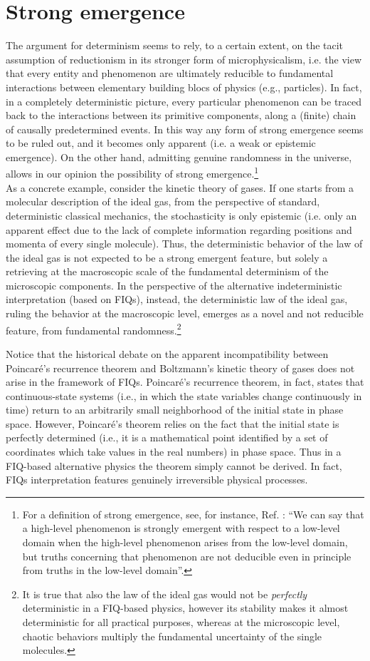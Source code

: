 \documentclass[aps,prl,twocolumn,showpacs,superscriptaddress,groupedaddress, nofootinbib]{revtex4-1}
\begin{document}
\section{Strong emergence}
The argument for determinism seems to rely, to a certain extent, on the tacit assumption of reductionism in its stronger form of microphysicalism, i.e. the view that every entity and phenomenon are ultimately reducible to fundamental interactions between elementary building blocs of physics (e.g., particles). In fact, in a completely deterministic picture, every particular phenomenon can be traced back to the interactions between its primitive components, along a (finite) chain of causally predetermined events. In this way any form of strong emergence seems to be ruled out, and it becomes only apparent (i.e. a weak or epistemic emergence). On the other hand, admitting genuine randomness in the universe, allows in our opinion the possibility of strong emergence.\footnote{For a definition of strong emergence, see, for instance, Ref. \cite{chalmers}: ``We can say that a high-level phenomenon is strongly emergent with respect to a
low-level domain when the high-level phenomenon arises from the low-level domain, but truths concerning that phenomenon are not deducible even in principle from truths in the low-level domain''.}\\
As a concrete example, consider the kinetic theory of gases. If one starts from a molecular description of the ideal gas, from the perspective of standard, deterministic classical mechanics, the stochasticity is only epistemic (i.e. only an apparent effect due to the lack of complete information regarding positions and momenta of every single molecule). Thus, the deterministic behavior of the law of the ideal gas is not expected to be a strong emergent feature, but solely a retrieving at the macroscopic scale of the fundamental determinism of the microscopic components.
In the perspective of the alternative indeterministic interpretation (based on FIQs), instead, the deterministic law of the ideal gas, ruling the behavior at the macroscopic level, emerges as a novel and not reducible feature, from fundamental randomness.\footnote{It is true that also the law of the ideal gas would not be \emph{perfectly} deterministic in a FIQ-based physics, however its stability makes it almost deterministic for all practical purposes, whereas at the microscopic level, chaotic behaviors multiply the fundamental uncertainty of the single molecules.}

Notice that the historical debate on the apparent incompatibility between Poincar\'e's recurrence theorem and Boltzmann's kinetic theory of gases does not arise in the framework of FIQs. Poincar\'e's recurrence theorem, in fact, states that continuous-state systems (i.e., in which the state variables change continuously in time) return to an arbitrarily small neighborhood of the initial state in phase space. However, Poincar\'e's theorem relies on the fact that the initial state is perfectly determined (i.e., it is a mathematical point identified by a set of coordinates which take values in the real numbers) in phase space. Thus in a FIQ-based alternative physics the theorem simply cannot be derived. In fact, FIQs interpretation features genuinely irreversible physical processes. 
\end{document}
